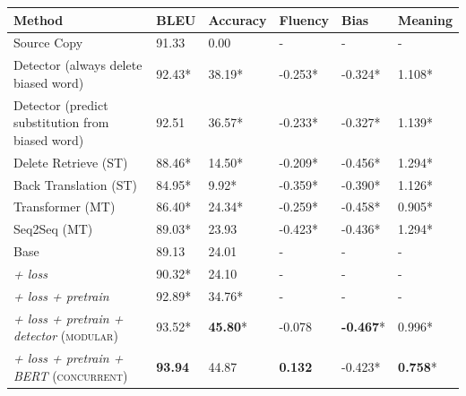 \begin{table}[]
\centering
\begin{tabular}{l|ll|lll}
\textbf{Method}                                                  & \textbf{BLEU} & \textbf{Accuracy} & \textbf{Fluency} & \textbf{Bias} & \textbf{Meaning} \\ \hline \hline
Source Copy                                             & 91.33 & 0.00  &   -     &        -      &    -       \\ \hline
Detector (always delete biased word)                                  & 92.43* & 38.19* &  -0.253* &   -0.324*         &      1.108*            \\ \hline
Detector (predict substitution from biased word)                                 & 92.51 & 36.57* &  -0.233*     &   -0.327*        &      1.139*         \\ \hline
Delete Retrieve (ST) \cite{li2018delete}                & 88.46* & 14.50* &    -0.209*      &   -0.456*     &     1.294*           \\ \hline
Back Translation (ST) \cite{prabhumoye2018style}        & 84.95* & 9.92* &   -0.359*     &       -0.390*  &   1.126*           \\ \hline
Transformer (MT) \cite{vaswani2017attention}           & 86.40* & 24.34* &  -0.259*     &    -0.458*      &    0.905*              \\ \hline
Seq2Seq (MT) \cite{luong2015effective}                 & 89.03* & 23.93 &  -0.423*        &   -0.436*       &    1.294*          \\  \hline  %
Base                                                    & 89.13 & 24.01 &   -      &    -          &    -       \\  
\emph{+ loss}                                             & 90.32* & 24.10 &  -       &  -            &   -        \\  
\emph{+ loss + pretrain }                                      & 92.89* & 34.76* &   -      &         -     &     -      \\
\emph{+ loss + pretrain + detector} (\textsc{modular})      & 93.52* & \textbf{45.80}* &   -0.078     &   \textbf{-0.467}*    &     0.996*             \\ %
\emph{+ loss + pretrain + BERT} (\textsc{concurrent})   & \textbf{93.94} & 44.87 &   \textbf{0.132}     &    -0.423*     &  \textbf{0.758}*              \\ \hline  %

\end{tabular}
\end{table}

